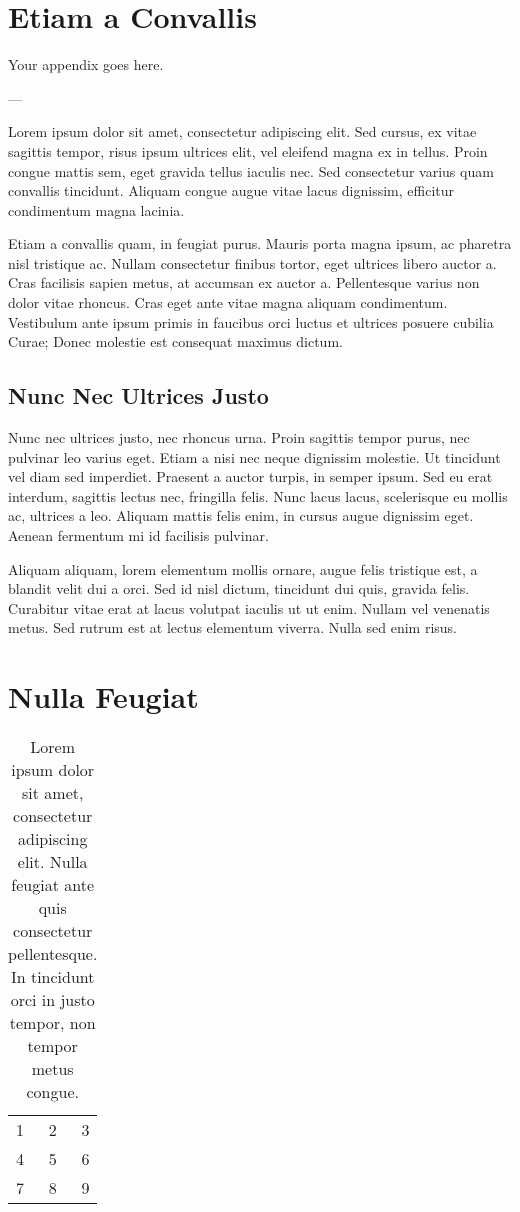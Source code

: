 \documentclass[dissertation]{msudissertation}
\begin{document}
\chapter{Etiam a Convallis}

Your appendix goes here.

---

Lorem ipsum dolor sit amet, consectetur adipiscing elit. Sed cursus, ex vitae sagittis tempor, risus ipsum ultrices elit, vel eleifend magna ex in tellus. Proin congue mattis sem, eget gravida tellus iaculis nec. Sed consectetur varius quam convallis tincidunt. Aliquam congue augue vitae lacus dignissim, efficitur condimentum magna lacinia.

Etiam a convallis quam, in feugiat purus. Mauris porta magna ipsum, ac pharetra nisl tristique ac. Nullam consectetur finibus tortor, eget ultrices libero auctor a. Cras facilisis sapien metus, at accumsan ex auctor a. Pellentesque varius non dolor vitae rhoncus. Cras eget ante vitae magna aliquam condimentum. Vestibulum ante ipsum primis in faucibus orci luctus et ultrices posuere cubilia Curae; Donec molestie est consequat maximus dictum.\cite{exampleref1}

\section{Nunc Nec Ultrices Justo}

Nunc nec ultrices justo, nec rhoncus urna. Proin sagittis tempor purus, nec pulvinar leo varius eget. Etiam a nisi nec neque dignissim molestie. Ut tincidunt vel diam sed imperdiet. Praesent a auctor turpis, in semper ipsum. Sed eu erat interdum, sagittis lectus nec, fringilla felis. Nunc lacus lacus, scelerisque eu mollis ac, ultrices a leo. Aliquam mattis felis enim, in cursus augue dignissim eget. Aenean fermentum mi id facilisis pulvinar.\cite{exampleref1}

Aliquam aliquam, lorem elementum mollis ornare, augue felis tristique est, a blandit velit dui a orci. Sed id nisl dictum, tincidunt dui quis, gravida felis. Curabitur vitae erat at lacus volutpat iaculis ut ut enim. Nullam vel venenatis metus. Sed rutrum est at lectus elementum viverra. Nulla sed enim risus.

\chapter{Nulla Feugiat}

\begin{table}[h]
  \centering
  \begin{tabular}{l c r}
    1 & 2 & 3 \\
    4 & 5 & 6 \\
    7 & 8 & 9 \\
  \end{tabular}
  \caption{Lorem ipsum dolor sit amet, consectetur adipiscing elit. Nulla feugiat ante quis consectetur pellentesque. In tincidunt orci in justo tempor, non tempor metus congue.\cite{exampleref1}}
\end{table}




\renewcommand{\bibname}{References}

\end{document}
